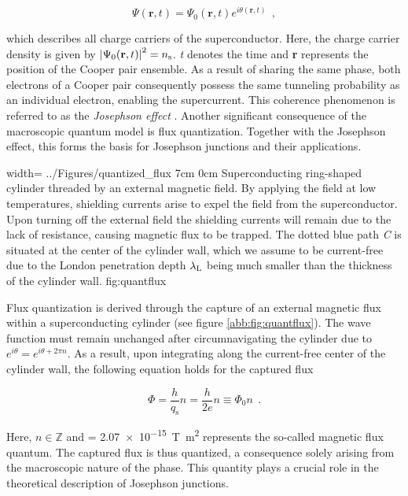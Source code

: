 \begin{equation}
\Psi(\textbf{r},t) = \Psi_0(\textbf{r},t)e^{i\theta(\textbf{r},t)} \ \ ,
\end{equation}

which describes all charge carriers of the superconductor. Here, the charge carrier density is given by $\left|\Psi_0(\textbf{r},t)\right|^2 = n_{\rm s}$. \textit{t} denotes the time and \textbf{r} represents the position of the Cooper pair ensemble. As a result of sharing the same phase, both electrons of a Cooper pair consequently possess the same tunneling probability as an individual electron, enabling the supercurrent. This coherence phenomenon is referred to as the \textit{Josephson effect} \cite{Josephson1962}. Another significant consequence of the macroscopic quantum model is flux quantization. Together with the Josephson effect, this forms the basis for Josephson junctions and their applications. 

{width=\textwidth}
{../Figures/quantized_flux}
{7cm}
{0cm}
{Superconducting ring-shaped cylinder threaded by an external magnetic field. By applying the field at low temperatures, shielding currents arise to expel the field from the superconductor. Upon turning off the external field the shielding currents will remain due to the lack of resistance, causing magnetic flux to be trapped. The dotted blue path \textit{C} is situated at the center of the cylinder wall, which we assume to be current-free due to the London penetration depth $\lambda_{\rm L}$ being much smaller than the thickness of the cylinder wall.} 
{fig:quantflux}

Flux quantization is derived through the capture of an external magnetic flux within a superconducting cylinder (see figure \ref{abb:fig:quantflux}). The wave function must remain unchanged after circumnavigating the cylinder due to $e^{i\theta} = e^{i\theta + 2\pi n}$. As a result, upon integrating along the current-free center of the cylinder wall, the following equation holds for the captured flux

\begin{equation}
\Phi = \frac{h}{q_\mathrm{s}}n = \frac{h}{2e}n \equiv \Phi_0n \ \ .
\end{equation}

Here, $n\in\mathbb{Z}$ and \unit{\fq} = \qty{2.07e-15}{\tesla\metre\squared} \cite{CODATA2018} represents the so-called magnetic flux quantum. The captured flux is thus quantized, a consequence solely arising from the macroscopic nature of the phase. This quantity plays a crucial role in the theoretical description of Josephson junctions.


